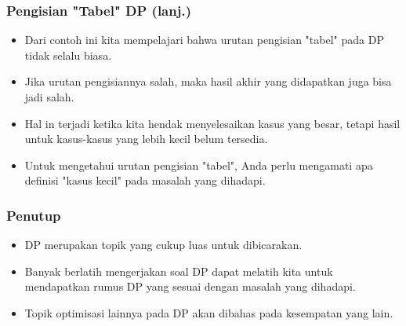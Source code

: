 \begin{frame}
\frametitle{Pengisian "Tabel" DP (lanj.)}
\begin{itemize}
  \item Dari contoh ini kita mempelajari bahwa urutan pengisian "tabel" pada DP \fbottomup tidak selalu biasa.
  \item Jika urutan pengisiannya salah, maka hasil akhir yang didapatkan juga bisa jadi salah.
  \item Hal in terjadi ketika kita hendak menyelesaikan kasus yang besar, tetapi hasil untuk kasus-kasus yang lebih kecil belum tersedia.
  \item Untuk mengetahui urutan pengisian "tabel", Anda perlu mengamati apa definisi "kasus kecil" pada masalah yang dihadapi.
\end{itemize}
\end{frame}

\begin{frame}
\frametitle{Penutup}
\begin{itemize}
  \item DP merupakan topik yang cukup luas untuk dibicarakan.
  \item Banyak berlatih mengerjakan soal DP dapat melatih kita untuk mendapatkan rumus DP yang sesuai dengan masalah yang dihadapi.
  \item Topik optimisasi lainnya pada DP akan dibahas pada kesempatan yang lain.  
\end{itemize}
\end{frame}



